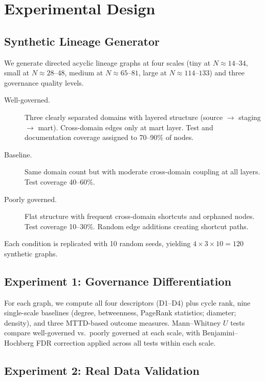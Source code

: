 \documentclass[11pt,a4paper]{article}
\begin{document}
\section{Experimental Design}

\subsection{Synthetic Lineage Generator}

We generate directed acyclic lineage graphs at four scales
(tiny at $N \approx 14$--$34$, small at $N \approx 28$--$48$, medium at
$N \approx 65$--$81$, large at $N \approx 114$--$133$) and three
governance quality levels.

\begin{description}
  \item[Well-governed.] Three clearly separated domains with layered
    structure (source $\to$ staging $\to$ mart). Cross-domain edges
    only at mart layer. Test and documentation coverage assigned to
    70--90\% of nodes.

  \item[Baseline.] Same domain count but with moderate cross-domain
    coupling at all layers. Test coverage 40--60\%.

  \item[Poorly governed.] Flat structure with frequent cross-domain
    shortcuts and orphaned nodes. Test coverage 10--30\%. Random edge
    additions creating shortcut paths.
\end{description}

Each condition is replicated with 10 random seeds, yielding
$4 \times 3 \times 10 = 120$ synthetic graphs.

\subsection{Experiment 1: Governance Differentiation}

For each graph, we compute all four descriptors (D1--D4) plus
cycle rank, nine single-scale baselines (degree, betweenness,
PageRank statistics; diameter; density), and three MTTD-based outcome
measures. Mann--Whitney $U$ tests compare well-governed vs.\
poorly governed at each scale, with Benjamini--Hochberg FDR correction
applied across all tests within each scale.

\subsection{Experiment 2: Real Data Validation}
\end{document}
